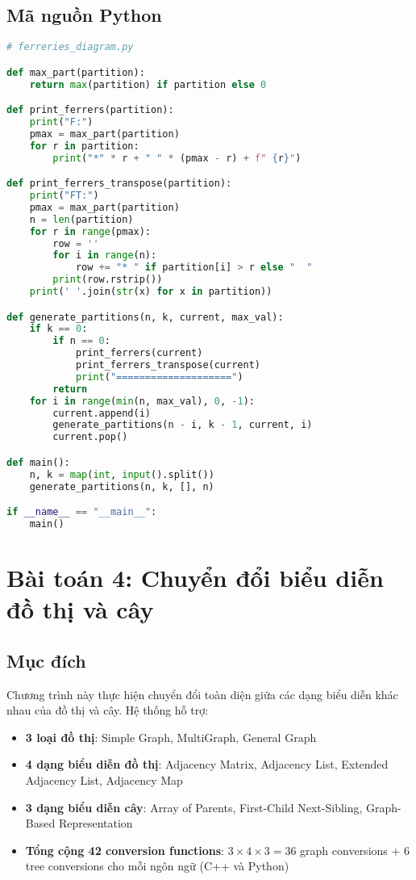 \documentclass[12pt]{article}
\begin{document}
\subsection*{Mã nguồn Python}
\begin{lstlisting}[language=Python, basicstyle=\ttfamily\footnotesize, frame=single]
# ferreries_diagram.py

def max_part(partition):
    return max(partition) if partition else 0

def print_ferrers(partition):
    print("F:")
    pmax = max_part(partition)
    for r in partition:
        print("*" * r + " " * (pmax - r) + f" {r}")

def print_ferrers_transpose(partition):
    print("FT:")
    pmax = max_part(partition)
    n = len(partition)
    for r in range(pmax):
        row = ''
        for i in range(n):
            row += "* " if partition[i] > r else "  "
        print(row.rstrip())
    print(' '.join(str(x) for x in partition))

def generate_partitions(n, k, current, max_val):
    if k == 0:
        if n == 0:
            print_ferrers(current)
            print_ferrers_transpose(current)
            print("====================")
        return
    for i in range(min(n, max_val), 0, -1):
        current.append(i)
        generate_partitions(n - i, k - 1, current, i)
        current.pop()

def main():
    n, k = map(int, input().split())
    generate_partitions(n, k, [], n)

if __name__ == "__main__":
    main() 
\end{lstlisting}


\section*{Bài toán 4: Chuyển đổi biểu diễn đồ thị và cây}

\subsection*{Mục đích}
Chương trình này thực hiện chuyển đổi toàn diện giữa các dạng biểu diễn khác nhau của đồ thị và cây. Hệ thống hỗ trợ:
\begin{itemize}
  \item \textbf{3 loại đồ thị}: Simple Graph, MultiGraph, General Graph
  \item \textbf{4 dạng biểu diễn đồ thị}: Adjacency Matrix, Adjacency List, Extended Adjacency List, Adjacency Map
  \item \textbf{3 dạng biểu diễn cây}: Array of Parents, First-Child Next-Sibling, Graph-Based Representation
  \item \textbf{Tổng cộng 42 conversion functions}: $3 \times 4 \times 3 = 36$ graph conversions + $6$ tree conversions cho mỗi ngôn ngữ (C++ và Python)
\end{itemize}
\end{document}
